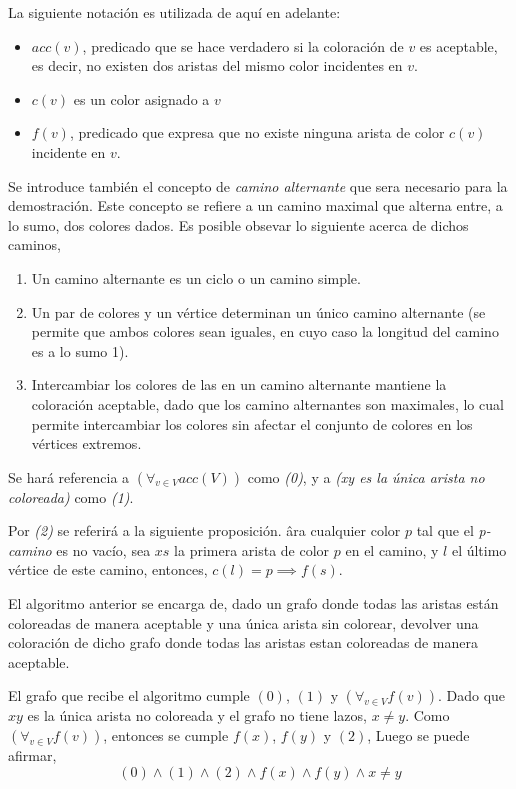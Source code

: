 \documentclass[../np-approximations.tex]{subfiles}
\begin{document}
La siguiente notación es utilizada de aquí en adelante:
\begin{itemize}
	\item $acc(v)$, predicado que se hace verdadero si la 
	      coloración de $v$ es aceptable, es decir, no existen dos 
	      aristas del mismo color incidentes en $v$.
	\item $c(v)$ es un color asignado a $v$
	\item $f(v)$, predicado que expresa que no existe ninguna
	      arista de color $c(v)$ incidente en $v$.
\end{itemize}

Se introduce también el concepto de \emph{camino alternante} que 
sera necesario para la demostración. Este concepto se refiere a un 
camino maximal que alterna entre, a lo sumo, dos colores dados. Es 
posible obsevar lo siguiente acerca de dichos caminos,
\begin{enumerate}
	\item Un camino alternante es un ciclo o un camino 
	      simple.
	\item Un par de colores y un vértice determinan un único 
	      camino alternante (se permite que ambos colores sean iguales, 
	      en cuyo caso la longitud del camino es a lo sumo 1).
	\item Intercambiar los colores de las en un camino 
	      alternante mantiene la coloración aceptable, dado que los 
	      camino alternantes son maximales, lo cual permite intercambiar 
	      los colores sin afectar el conjunto de colores en los vértices 
	      extremos.
\end{enumerate}

Se hará referencia a $(\forall_{v \in V} acc(V))$ como \emph{(0)}, 
y a \emph{(xy es la única arista no coloreada)} como \emph{(1)}.

Por \emph{(2)} se referirá a la siguiente proposición. âra cualquier color $p$
tal que el \emph{p-camino} es no vacío, sea $xs$ la primera arista de color $p$
en el camino, y $l$ el último vértice de este camino, entonces,
$c(l)=p \implies f(s)$.


El algoritmo anterior se encarga de, dado un grafo donde todas las 
aristas están coloreadas de manera aceptable y una única arista sin 
colorear, devolver una coloración de dicho grafo donde todas las 
aristas estan coloreadas de manera aceptable.

El grafo que recibe el algoritmo cumple $(0)$, $(1)$ y
$(\forall_{v \in V} f(v))$. Dado que $xy$ es la única arista no 
coloreada y el grafo no tiene lazos, $x \neq y$. Como
$(\forall_{v \in V} f(v))$, entonces se cumple $f(x)$, $f(y)$ y
$(2)$, Luego se puede afirmar,
\begin{equation*}
	(0) \wedge (1) \wedge (2) \wedge
	f(x) \wedge f(y) \wedge x \neq y
\end{equation*}
\end{document}
